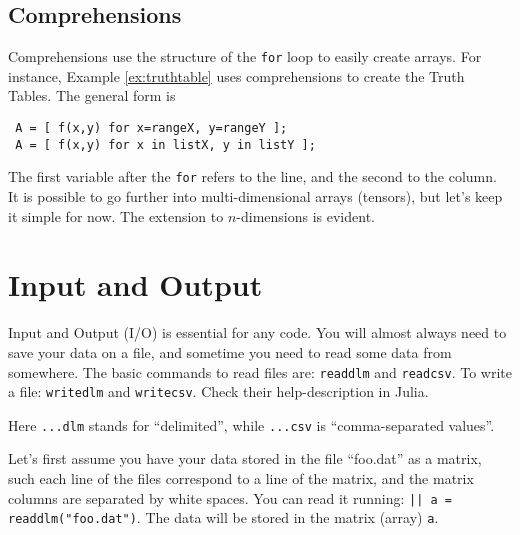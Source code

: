 \subsection{Comprehensions}
\label{sec:comprehensions}

Comprehensions use the structure of the \texttt{for} loop to easily create arrays. For instance, Example \ref{ex:truthtable} uses comprehensions to create the Truth Tables. The general form is

\begin{verbatim}
 A = [ f(x,y) for x=rangeX, y=rangeY ];
 A = [ f(x,y) for x in listX, y in listY ];
\end{verbatim}

The first variable after the \texttt{for} refers to the line, and the second to the column. It is possible to go further into multi-dimensional arrays (tensors), but let's keep it simple for now. The extension to $n$-dimensions is evident.




\section{Input and Output}

Input and Output (I/O) is essential for any code. You will almost always need to save your data on a file, and sometime you need to read some data from somewhere. The basic commands to read files are: \texttt{readdlm} and \texttt{readcsv}. To write a file: \texttt{writedlm} and \texttt{writecsv}. Check their help-description in Julia.

Here \texttt{...dlm} stands for ``delimited'', while \texttt{...csv} is ``comma-separated values''.

Let's first assume you have your data stored in the file ``foo.dat'' as a matrix, such each line of the files correspond to a line of the matrix, and the matrix columns are separated by white spaces. You can read it running: \texttt{|\julia| a = readdlm("foo.dat")}. The data will be stored in the matrix (array) \texttt{a}. 

